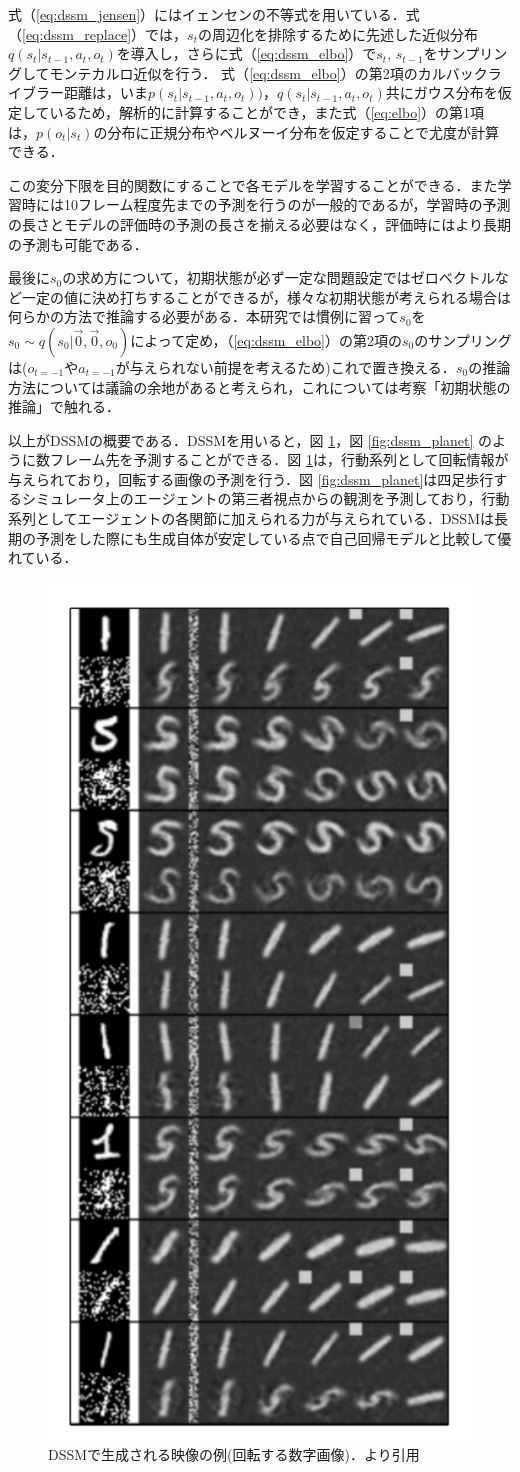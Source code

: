 式（\ref{eq:dssm_jensen}）にはイェンセンの不等式を用いている．式（\ref{eq:dssm_replace}）では，$s_t$の周辺化を排除するために先述した近似分布$q(s_t|s_{t-1}, a_t, o_t)$を導入し，さらに式（\ref{eq:dssm_elbo}）で$s_t$, $s_{t-1}$をサンプリングしてモンテカルロ近似を行う．
式（\ref{eq:dssm_elbo}）の第2項のカルバックライブラー距離は，いま$p(s_t|s_{t-1}, a_t, o_t))$，$q(s_t|s_{t-1}, a_t, o_t)$共にガウス分布を仮定しているため，解析的に計算することができ，また式（\ref{eq:elbo}）の第1項は，$p(o_t|s_t)$の分布に正規分布やベルヌーイ分布を仮定することで尤度が計算できる．

この変分下限を目的関数にすることで各モデルを学習することができる．また学習時には10フレーム程度先までの予測を行うのが一般的であるが，学習時の予測の長さとモデルの評価時の予測の長さを揃える必要はなく，評価時にはより長期の予測も可能である．

最後に$s_0$の求め方について，初期状態が必ず一定な問題設定ではゼロベクトルなど一定の値に決め打ちすることができるが，様々な初期状態が考えられる場合は何らかの方法で推論する必要がある．本研究では慣例に習って$s_0$を$s_0 \sim q(s_0|\vec{0}, \vec{0}, o_0) $によって定め，（\ref{eq:dssm_elbo}）の第2項の$s_0$のサンプリングは($o_{t=-1}$や$a_{t=-1}$が与えられない前提を考えるため)これで置き換える．$s_0$の推論方法については議論の余地があると考えられ，これについては考察「初期状態の推論」で触れる．

\vspace{\baselineskip}
以上がDSSMの概要である．DSSMを用いると，図 \ref{fig:dssm_dkf}，図 \ref{fig:dssm_planet} のように数フレーム先を予測することができる．図 \ref{fig:dssm_dkf}は，行動系列として回転情報が与えられており，回転する画像の予測を行う．図 \ref{fig:dssm_planet}は四足歩行するシミュレータ上のエージェントの第三者視点からの観測を予測しており，行動系列としてエージェントの各関節に加えられる力が与えられている．DSSMは長期の予測をした際にも生成自体が安定している点で自己回帰モデルと比較して優れている．

\begin{figure}[h]
  \begin{center}
    \includegraphics[width=0.20\linewidth]{./figures/dssm_dkf.png}
    \caption[DSSMで生成される映像の例(回転する数字画像)]{DSSMで生成される映像の例(回転する数字画像)．\cite{krishnan2015deep}より引用}
    \label{fig:dssm_dkf}
  \end{center}
\end{figure}

